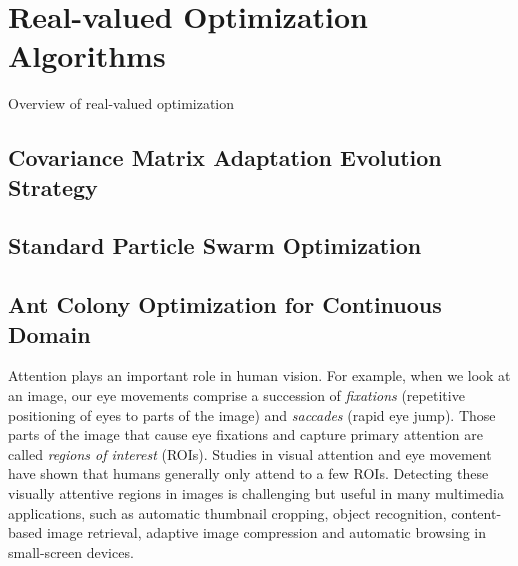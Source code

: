 \chapter{Real-valued Optimization Algorithms}
\label{c:algos}

Overview of real-valued optimization

\section{Covariance Matrix Adaptation Evolution Strategy}


\section{Standard Particle Swarm Optimization}


\section{Ant Colony Optimization for Continuous Domain}

Attention plays an important role in human vision. For example, when
we look at an image, our eye movements comprise a succession of {\em
fixations} (repetitive positioning of eyes to parts of the image)
and {\em saccades} (rapid eye jump). Those parts of the image that
cause eye fixations and capture primary attention are called {\em
regions of interest} (ROIs). Studies in visual attention and eye
movement have shown that humans generally only attend to a few ROIs.
Detecting these visually attentive regions in images is challenging
but useful in many multimedia applications, such as automatic
thumbnail cropping, object recognition, content-based image
retrieval, adaptive image compression and automatic browsing in
small-screen devices.

